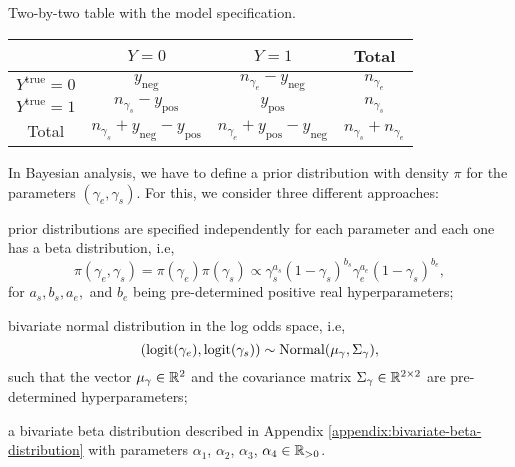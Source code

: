 \begin{quadro}[!ht]
  \centering
  \caption{\label{table:two-by-two-data}Two-by-two table with the model specification.}
  \begin{tabular}{c|c|c|c|}
    \cline{2-4}
                                                 & $Y = 0$                                              & $Y = 1$                           & Total          \\ \hline
    \multicolumn{1}{|c|}{$Y^{\mathrm{true}}= 0$} & $y_{\mathrm{neg}}$                                   & $n_{\gamma_e} - y_{\mathrm{neg}}$ & $n_{\gamma_e}$ \\ \hline
    \multicolumn{1}{|c|}{$Y^{\mathrm{true}}= 1$} & $n_{\gamma_s} -
    y_{\mathrm{pos}}$                            & $y_{\mathrm{pos}}$                                   & $n_{\gamma_s}$                                     \\ \hline
    \multicolumn{1}{|c|}{Total}                  & $n_{\gamma_s} + y_{\mathrm{neg}} -
    y_{\mathrm{pos}}$                            & $n_{\gamma_e} + y_{\mathrm{pos}} - y_{\mathrm{neg}}$ &
    $n_{\gamma_s} + n_{\gamma_e}$                                                                                                                            \\\hline
  \end{tabular}
\end{quadro}

In Bayesian analysis, we have to define a prior distribution with density $\pi$ for the
parameters $(\gamma_e, \gamma_s)$. For this, we consider three different approaches:

\begin{alineas}
  \item prior distributions are specified independently for each parameter and
  each one has a beta distribution, i.e,
  $$\pi(\gamma_e, \gamma_s) =
    \pi(\gamma_e)\pi(\gamma_s) \propto \gamma_s^{a_s}(1-
    \gamma_s)^{b_s}\gamma_e^{a_e}(1-\gamma_s)^{b_e},$$
  for $a_s, b_s, a_e,$ and $b_e$ being pre-determined positive real hyperparameters;
  \item bivariate normal distribution in the log odds space, i.e,
  $$(\operatorname{logit}(\gamma_e), \operatorname{logit}(\gamma_s)) \sim
    \operatorname{Normal}(\mu_{\gamma}, \Sigma_{\gamma}),$$
  such that the vector $\mu_{\gamma} \in \mathbb{R}^2$ and the covariance matrix
  $\Sigma_{\gamma} \in \mathbb{R}^{2\times 2}$ are pre-determined hyperparameters;
  \item a bivariate beta distribution described in Appendix \ref{appendix:bivariate-beta-distribution}
  with parameters $\alpha_1$, $\alpha_2$, $\alpha_3$, $\alpha_4 \in \mathbb{R}_{>0}$.
\end{alineas}

